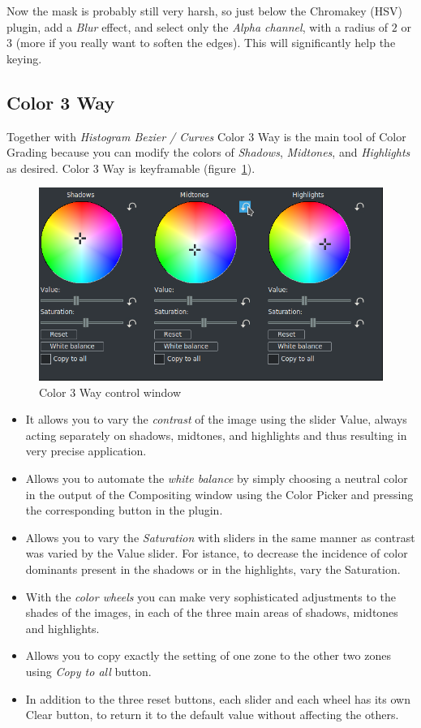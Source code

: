 Now the mask is probably still very harsh, so just below the Chromakey (HSV) plugin, add a \textit{Blur} effect, and select only the \textit{Alpha channel}, with a radius of $2$ or $3$ (more if you really want to soften the edges). This will significantly help the keying.

\subsection{Color 3 Way}%
\label{sub:color_3_way}

Together with \textit{Histogram Bezier / Curves} Color 3 Way is the main tool of Color Grading because you can modify the colors of \textit{Shadows}, \textit{Midtones}, and \textit{Highlights} as desired. Color 3 Way is keyframable (figure~\ref{fig:color3way}).

\begin{figure}[htpb]
    \centering
    \includegraphics[width=0.8\linewidth]{images/color3way.png}
    \caption{Color 3 Way control window}
    \label{fig:color3way}
\end{figure}

\begin{itemize}
    \item It allows you to vary the \textit{contrast} of the image using the slider Value, always acting separately on shadows, midtones, and highlights and thus resulting in very precise application.
    \item Allows you to automate the \textit{white balance} by simply choosing a neutral color in the output of the Compositing window using the Color Picker and pressing the corresponding button in the plugin.
    \item Allows you to vary the \textit{Saturation} with sliders in the same manner as contrast was varied by the Value slider. For istance, to decrease the incidence of color dominants present in the shadows or in the highlights, vary the Saturation.
    \item With the \textit{color wheels} you can make very sophisticated adjustments to the shades of the images, in each of the three main areas of shadows, midtones and highlights.
    \item Allows you to copy exactly the setting of one zone to the other two zones using \textit{Copy to all} button.
    \item In addition to the three reset buttons, each slider and each wheel has its own Clear button, to return it to the default value without affecting the others.
\end{itemize}

